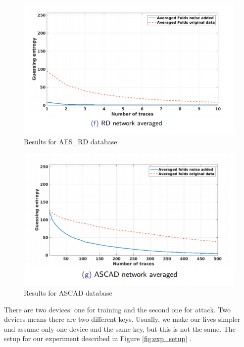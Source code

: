 \begin{figure}
    \centering
    \includegraphics[scale=0.5]{images/chapter8/aes_rd.PNG}
    \caption{Results for AES\_RD database}
    \label{fig:aes_rd_results}
\end{figure}

\begin{figure}
    \centering
    \includegraphics[scale=0.5]{images/chapter8/ascad.PNG}
    \caption{Results for ASCAD database}
    \label{fig:ascad_results}
\end{figure}

There are two devices: one for training and the second one for attack. Two devices means there are two different keys. Usually, we make our lives simpler and assume only one device and the same key, but this is not the same.
The setup for our experiment described in Figure \ref{fig:exp_setup} .

